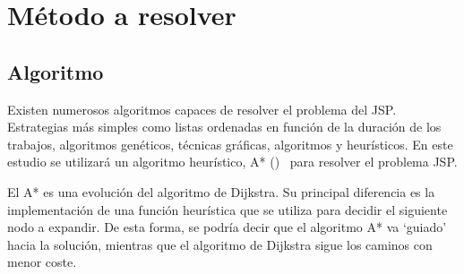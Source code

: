 \section{Método a resolver}

\subsection{Algoritmo}

Existen numerosos algoritmos capaces de resolver el problema del JSP\@.
Estrategias más simples como listas ordenadas en función de la duración
de los trabajos, algoritmos genéticos, técnicas gráficas,
algoritmos  y heurísticos.
En este estudio se utilizará un algoritmo heurístico, A* ()~\cite{HNR68}
para resolver el problema JSP\@.

El A* es una evolución del algoritmo de Dijkstra.
Su principal diferencia es la implementación de una función heurística
que se utiliza para decidir el siguiente nodo a expandir.
De esta forma, se podría decir que el algoritmo A* va `guiado'
hacia la solución, mientras que el algoritmo de Dijkstra
sigue los caminos con menor coste.

